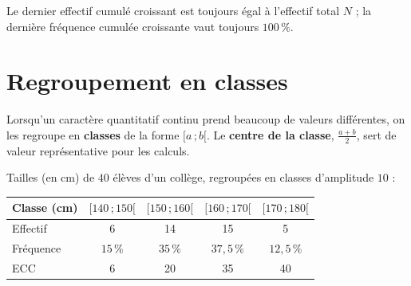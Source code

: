 \begin{remarque}
Le dernier effectif cumulé croissant est toujours égal à l'effectif total $N$ ; la dernière
fréquence cumulée croissante vaut toujours $100\,\%$.
\end{remarque}

\section{Regroupement en classes}

\begin{definition}[Classes]
Lorsqu'un caractère quantitatif continu prend beaucoup de valeurs différentes, on les
regroupe en \textbf{classes} de la forme $[a\,;b[$. Le \textbf{centre de la classe},
$\frac{a+b}{2}$, sert de valeur représentative pour les calculs.
\end{definition}

\begin{exemple}
Tailles (en cm) de $40$ élèves d'un collège, regroupées en classes d'amplitude $10$ :
\begin{center}
\small
\begin{tabular}{lcccc}
\toprule
Classe (cm) & $[140\,;150[$ & $[150\,;160[$ & $[160\,;170[$ & $[170\,;180[$ \\
\midrule
Effectif & 6 & 14 & 15 & 5 \\
Fréquence & $15\,\%$ & $35\,\%$ & $37{,}5\,\%$ & $12{,}5\,\%$ \\
ECC & 6 & 20 & 35 & 40 \\
\bottomrule
\end{tabular}
\end{center}
\end{exemple}

\begin{illus}
\end{illus}

